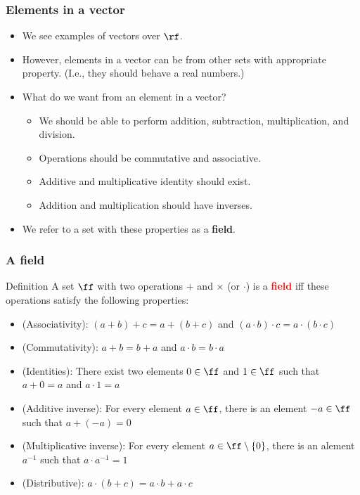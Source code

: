 \begin{frame}
  \frametitle{Elements in a vector}
  \begin{itemize}
  \item We see examples of vectors over $\rf$.
  \item However, elements in a vector can be from other sets with
    appropriate property.  (I.e., they should behave a real numbers.)
  \item What do we want from an element in a vector?
    \begin{itemize}
    \item We should be able to perform addition, subtraction, multiplication, and division.
    \item Operations should be commutative and associative.
    \item Additive and multiplicative identity should exist.
    \item Addition and multiplication should have inverses.
    \end{itemize}

    \item We refer to a set with these properties as a {\bf field}.
  \end{itemize}
\end{frame}

\begin{frame}
  \frametitle{A field}

  \begin{block}{Definition}
    A set $\ff$ with two operations $+$ and $\times$ (or $\cdot$) is a
    \textcolor{red}{\bf field} iff these operations satisfy the
    following properties:
    \begin{itemize}
    \item (Associativity): $(a+b)+c = a+(b+c)$ and $(a\cdot b)\cdot c = a\cdot(b\cdot c)$
    \item (Commutativity): $a+b=b+a$ and $a\cdot b=b\cdot a$
    \item (Identities): There exist two elements $0\in\ff$ and $1\in\ff$ such that $a+0 = a$ and $a\cdot 1 = a$
    \item (Additive inverse): For every element $a\in \ff$, there is an element $-a\in \ff$ such that $a+(-a) = 0$
    \item (Multiplicative inverse): For every element $a\in \ff\setminus\{0\}$, there is an alement $a^{-1}$ such that $a\cdot a^{-1}=1$
    \item (Distributive): $a\cdot(b+c)=a\cdot b + a\cdot c$
    \end{itemize}
  \end{block}
\end{frame}

